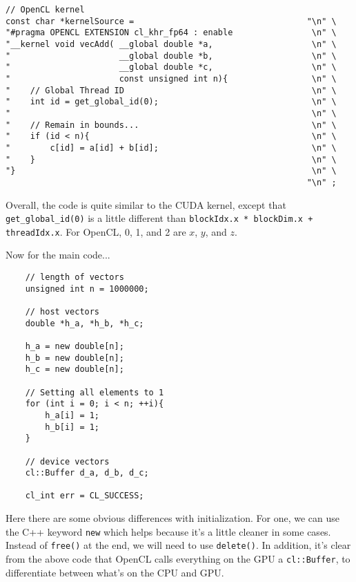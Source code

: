 \documentclass[11pt]{article}
\begin{document}
\begin{lstlisting}
// OpenCL kernel
const char *kernelSource =                                   "\n" \
"#pragma OPENCL EXTENSION cl_khr_fp64 : enable                \n" \
"__kernel void vecAdd( __global double *a,                    \n" \
"                      __global double *b,                    \n" \
"                      __global double *c,                    \n" \
"                      const unsigned int n){                 \n" \
"    // Global Thread ID                                      \n" \
"    int id = get_global_id(0);                               \n" \
"                                                             \n" \
"    // Remain in bounds...                                   \n" \
"    if (id < n){                                             \n" \
"        c[id] = a[id] + b[id];                               \n" \
"    }                                                        \n" \
"}                                                            \n" \
                                                             "\n" ;
\end{lstlisting}

Overall, the code is quite similar to the CUDA kernel, except that \lstinline{get_global_id(0)} is a little different than \lstinline{blockIdx.x * blockDim.x + threadIdx.x}. For OpenCL, 0, 1, and 2 are $x$, $y$, and $z$.

Now for the main code...
\begin{lstlisting}
    // length of vectors
    unsigned int n = 1000000;

    // host vectors
    double *h_a, *h_b, *h_c;

    h_a = new double[n];
    h_b = new double[n];
    h_c = new double[n];

    // Setting all elements to 1
    for (int i = 0; i < n; ++i){
        h_a[i] = 1;
        h_b[i] = 1;
    }

    // device vectors
    cl::Buffer d_a, d_b, d_c;

    cl_int err = CL_SUCCESS;
\end{lstlisting}

Here there are some obvious differences with initialization. For one, we can use the C++ keyword \lstinline{new} which helps because it's a little cleaner in some cases. Instead of \lstinline{free()} at the end, we will need to use \lstinline{delete()}. In addition, it's clear from the above code that OpenCL calls everything on the GPU a \lstinline{cl::Buffer}, to differentiate between what's on the CPU and GPU. 
\end{document}
